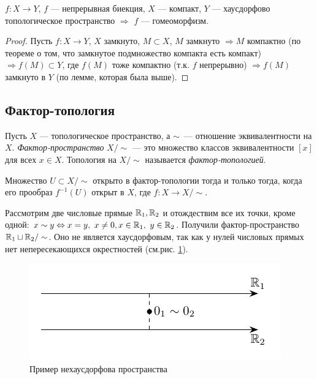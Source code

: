 \begin{statement}
    $f: X \to Y$, $f$ — непрерывная биекция, $X$ — компакт, $Y$ — хаусдорфово топологическое пространство $\Longrightarrow$ $f$ — гомеоморфизм.
\end{statement}
\begin{proof}
    Пусть $f: X \to Y$, $X$ замкнуто, $M \subset X$, $M$ замкнуто $\Longrightarrow M$ компактно (по теореме о том, что замкнутое подмножество компакта есть компакт) $\Longrightarrow f(M) \subset Y$, где $f(M)$ тоже компактно (т.к. $f$ непрерывно) $\Longrightarrow f(M)$ замкнуто в $Y$ (по лемме, которая была выше). 
\end{proof}


\subsection{Фактор-топология}


\begin{definition}
    Пусть $X$ — топологическое пространство, а $\sim$ — отношение эквивалентности на $X$. \textit{Фактор-пространство} $X / \sim$ — это множество классов эквивалентности $[x]$ для всех $x \in X$. Топология на $X / \sim$ называется \textit{фактор-топологией}.

    Множество $U \subset X / \sim $ открыто в фактор-топологии тогда и только тогда, когда его прообраз $f^{-1}(U)$ открыт в $X$, где $f: X \to X / \sim$.
\end{definition}

\begin{example}
    Рассмотрим две числовые прямые $\mathbb{R}_1, \mathbb{R}_2$ и отождествим все их точки, кроме одной: $x \sim y \Leftrightarrow x = y, \ x \ne 0, x \in \mathbb{R}_1, \ y \in \mathbb{R}_2$. 
    Получили фактор-пространство $\mathbb{R}_1 \sqcup \mathbb{R}_2 / \sim$.
    Оно не является хаусдорфовым, так как у нулей числовых прямых нет непересекающихся окрестностей (см.рис. \ref{fig:c2.1}).

    \begin{figure}
        \centering
        \includegraphics{images/c2.1.pdf}
        \caption{Пример нехаусдорфова пространства}
        \label{fig:c2.1}
    \end{figure}
\end{example}
